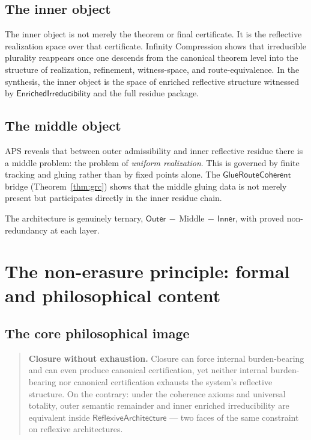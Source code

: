 \documentclass[11pt]{article}
\newcommand{\Outer}{\ensuremath{\mathsf{Outer}}}
\newcommand{\Inner}{\ensuremath{\mathsf{Inner}}}
\newcommand{\RAL}{\ensuremath{\mathsf{ReflexiveArchitecture}}}
\newcommand{\EnrIrr}{\ensuremath{\mathsf{EnrichedIrreducibility}}}
\newcommand{\GRC}{\ensuremath{\mathsf{GlueRouteCoherent}}}
\begin{document}
\subsection{The inner object}

The inner object is not merely the theorem or final certificate.  It is the reflective
realization space over that certificate.  Infinity Compression shows that irreducible
plurality reappears once one descends from the canonical theorem level into the
structure of realization, refinement, witness-space, and route-equivalence.  In the
synthesis, the inner object is the space of enriched reflective structure witnessed by
$\EnrIrr$ and the full residue package.

\subsection{The middle object}

APS reveals that between outer admissibility and inner reflective residue there is a
middle problem: the problem of \emph{uniform realization}.  This is governed by finite
tracking and gluing rather than by fixed points alone.  The $\GRC$ bridge
(Theorem~\ref{thm:grc}) shows that the middle gluing data is not merely present but
participates directly in the inner residue chain.

The architecture is genuinely ternary, $\Outer\,-\,\text{Middle}\,-\,\Inner$, with
proved non-redundancy at each layer.

\section{The non-erasure principle: formal and philosophical content}
\label{sec:nonerasure}

\subsection{The core philosophical image}

\begin{quote}
\textbf{Closure without exhaustion.}
Closure can force internal burden-bearing and can even produce canonical certification,
yet neither internal burden-bearing nor canonical certification exhausts the system's
reflective structure.  On the contrary: under the coherence axioms and universal
totality, outer semantic remainder and inner enriched irreducibility are equivalent
inside $\RAL$ --- two faces of the same constraint on reflexive architectures.
\end{quote}
\end{document}
